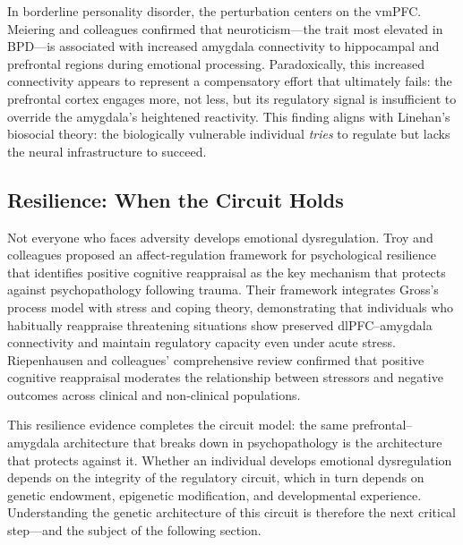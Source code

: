 In borderline personality disorder, the perturbation centers on the vmPFC.
Meiering and colleagues confirmed that neuroticism---the trait most elevated in
BPD---is associated with increased amygdala connectivity to hippocampal and
prefrontal regions during emotional processing.  Paradoxically, this
increased connectivity appears to represent a compensatory effort that ultimately
fails: the prefrontal cortex engages more, not less, but its regulatory signal
is insufficient to override the amygdala's heightened reactivity.  This finding
aligns with Linehan's biosocial theory: the biologically vulnerable individual
\textit{tries} to regulate but lacks the neural infrastructure to succeed.

\subsection*{Resilience: When the Circuit Holds}

Not everyone who faces adversity develops emotional dysregulation.  Troy and
colleagues proposed an affect-regulation framework for psychological
resilience that identifies positive cognitive reappraisal as the key mechanism
that protects against psychopathology following trauma.  Their framework
integrates Gross's process model with stress and coping theory, demonstrating
that individuals who habitually reappraise threatening situations show preserved
dlPFC--amygdala connectivity and maintain regulatory capacity even under acute
stress.  Riepenhausen and colleagues' comprehensive review confirmed that
positive cognitive reappraisal moderates the relationship between stressors and
negative outcomes across clinical and non-clinical populations.

This resilience evidence completes the circuit model: the same
prefrontal--amygdala architecture that breaks down in psychopathology is the
architecture that protects against it.  Whether an individual develops emotional
dysregulation depends on the integrity of the regulatory circuit, which in turn
depends on genetic endowment, epigenetic modification, and developmental
experience.  Understanding the genetic architecture of this circuit is therefore
the next critical step---and the subject of the following section.
